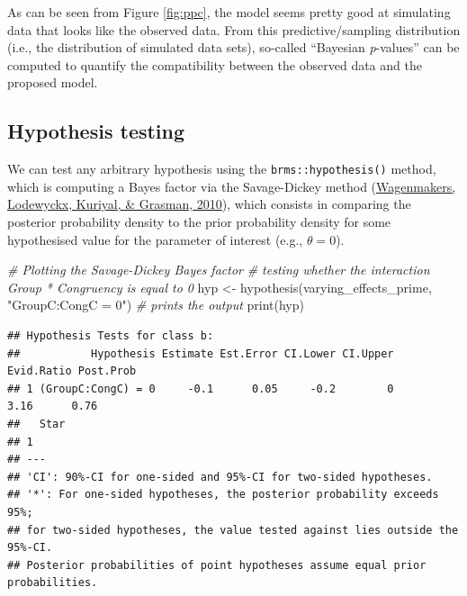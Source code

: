 \documentclass[
  11pt,
  english,
  ,doc,floatsintext]{apa6}
\newenvironment{Shaded}{}{}
\newcommand{\CommentTok}[1]{\textcolor[rgb]{0.38,0.63,0.69}{\textit{#1}}}
\newcommand{\FunctionTok}[1]{\textcolor[rgb]{0.02,0.16,0.49}{#1}}
\newcommand{\NormalTok}[1]{#1}
\newcommand{\OtherTok}[1]{\textcolor[rgb]{0.00,0.44,0.13}{#1}}
\newcommand{\StringTok}[1]{\textcolor[rgb]{0.25,0.44,0.63}{#1}}
\begin{document}
As can be seen from Figure \ref{fig:ppc}, the model seems pretty good at simulating data that looks like the observed data. From this predictive/sampling distribution (i.e., the distribution of simulated data sets), so-called ``Bayesian \emph{p}-values'' can be computed to quantify the compatibility between the observed data and the proposed model.

\newpage

\hypertarget{hypothesis-testing}{%
\subsection{Hypothesis testing}\label{hypothesis-testing}}

We can test any arbitrary hypothesis using the \texttt{brms::hypothesis()} method, which is computing a Bayes factor via the Savage-Dickey method (\protect\hyperlink{ref-wagenmakers_bayesian_2010}{Wagenmakers, Lodewyckx, Kuriyal, \& Grasman, 2010}), which consists in comparing the posterior probability density to the prior probability density for some hypothesised value for the parameter of interest (e.g., \(\theta = 0\)).

\begin{Shaded}
\begin{Highlighting}[]
\CommentTok{\# Plotting the Savage{-}Dickey Bayes factor}
\CommentTok{\# testing whether the interaction Group * Congruency is equal to 0}
\NormalTok{hyp }\OtherTok{\textless{}{-}} \FunctionTok{hypothesis}\NormalTok{(varying\_effects\_prime, }\StringTok{"GroupC:CongC = 0"}\NormalTok{)}
\CommentTok{\# prints the output}
\FunctionTok{print}\NormalTok{(hyp)}
\end{Highlighting}
\end{Shaded}

\begin{verbatim}
## Hypothesis Tests for class b:
##           Hypothesis Estimate Est.Error CI.Lower CI.Upper Evid.Ratio Post.Prob
## 1 (GroupC:CongC) = 0     -0.1      0.05     -0.2        0       3.16      0.76
##   Star
## 1     
## ---
## 'CI': 90%-CI for one-sided and 95%-CI for two-sided hypotheses.
## '*': For one-sided hypotheses, the posterior probability exceeds 95%;
## for two-sided hypotheses, the value tested against lies outside the 95%-CI.
## Posterior probabilities of point hypotheses assume equal prior probabilities.
\end{verbatim}
\end{document}
